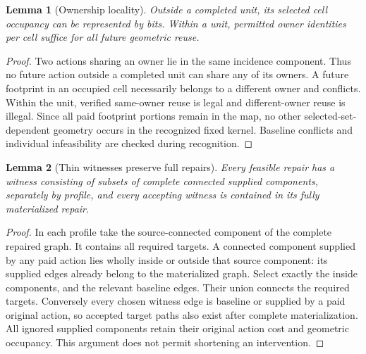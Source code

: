 \documentclass[10pt]{article}
\newtheorem{lemma}{Lemma}
\begin{document}
\begin{lemma}[Ownership locality]
Outside a completed unit, its selected cell occupancy can be represented by bits. Within a unit, permitted owner identities per cell suffice for all future geometric reuse.
\end{lemma}
\begin{proof}
Two actions sharing an owner lie in the same incidence component. Thus no future action outside a completed unit can share any of its owners. A future footprint in an occupied cell necessarily belongs to a different owner and conflicts. Within the unit, verified same-owner reuse is legal and different-owner reuse is illegal. Since all paid footprint portions remain in the map, no other selected-set-dependent geometry occurs in the recognized fixed kernel. Baseline conflicts and individual infeasibility are checked during recognition.
\end{proof}

\begin{lemma}[Thin witnesses preserve full repairs]
Every feasible repair has a witness consisting of subsets of complete connected supplied components, separately by profile, and every accepting witness is contained in its fully materialized repair.
\end{lemma}
\begin{proof}
In each profile take the source-connected component of the complete repaired graph. It contains all required targets. A connected component supplied by any paid action lies wholly inside or outside that source component: its supplied edges already belong to the materialized graph. Select exactly the inside components, and the relevant baseline edges. Their union connects the required targets. Conversely every chosen witness edge is baseline or supplied by a paid original action, so accepted target paths also exist after complete materialization. All ignored supplied components retain their original action cost and geometric occupancy. This argument does not permit shortening an intervention.
\end{proof}
\end{document}
